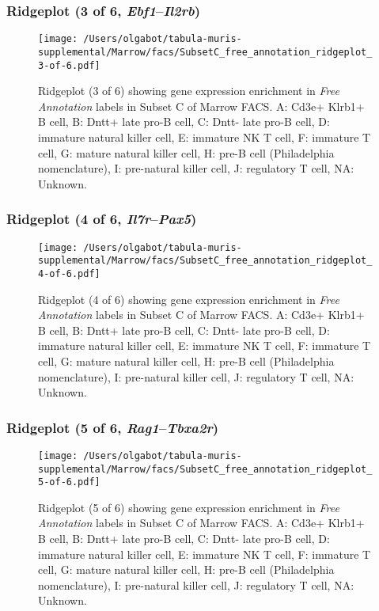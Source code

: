 \clearpage

\subsubsection{Ridgeplot (3 of 6, \emph{Ebf1}--\emph{Il2rb})}
\begin{figure}[h]
\centering
\texttt{[image: /Users/olgabot/tabula-muris-supplemental/Marrow/facs/SubsetC\_free\_annotation\_ridgeplot\_3-of-6.pdf]}

\caption{ Ridgeplot (3 of 6)  showing gene expression enrichment in \emph{Free Annotation} labels in Subset C of Marrow FACS. A: Cd3e+ Klrb1+ B cell, B: Dntt+ late pro-B cell, C: Dntt- late pro-B cell, D: immature natural killer cell, E: immature NK T cell, F: immature T cell, G: mature natural killer cell, H: pre-B cell (Philadelphia nomenclature), I: pre-natural killer cell, J: regulatory T cell, NA: Unknown.}
\end{figure}


\clearpage

\subsubsection{Ridgeplot (4 of 6, \emph{Il7r}--\emph{Pax5})}
\begin{figure}[h]
\centering
\texttt{[image: /Users/olgabot/tabula-muris-supplemental/Marrow/facs/SubsetC\_free\_annotation\_ridgeplot\_4-of-6.pdf]}

\caption{ Ridgeplot (4 of 6)  showing gene expression enrichment in \emph{Free Annotation} labels in Subset C of Marrow FACS. A: Cd3e+ Klrb1+ B cell, B: Dntt+ late pro-B cell, C: Dntt- late pro-B cell, D: immature natural killer cell, E: immature NK T cell, F: immature T cell, G: mature natural killer cell, H: pre-B cell (Philadelphia nomenclature), I: pre-natural killer cell, J: regulatory T cell, NA: Unknown.}
\end{figure}


\clearpage

\subsubsection{Ridgeplot (5 of 6, \emph{Rag1}--\emph{Tbxa2r})}
\begin{figure}[h]
\centering
\texttt{[image: /Users/olgabot/tabula-muris-supplemental/Marrow/facs/SubsetC\_free\_annotation\_ridgeplot\_5-of-6.pdf]}

\caption{ Ridgeplot (5 of 6)  showing gene expression enrichment in \emph{Free Annotation} labels in Subset C of Marrow FACS. A: Cd3e+ Klrb1+ B cell, B: Dntt+ late pro-B cell, C: Dntt- late pro-B cell, D: immature natural killer cell, E: immature NK T cell, F: immature T cell, G: mature natural killer cell, H: pre-B cell (Philadelphia nomenclature), I: pre-natural killer cell, J: regulatory T cell, NA: Unknown.}
\end{figure}


